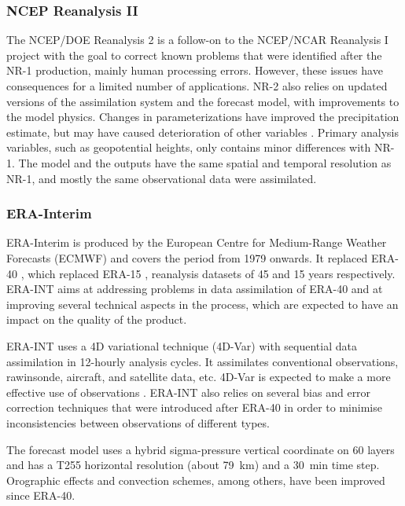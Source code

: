 \documentclass{ametsoc}
\begin{document}
\subsubsection{NCEP Reanalysis II}

The NCEP/DOE Reanalysis 2 \citep[NR-2,][]{Kanamitsu2002} is a follow-on to the NCEP/NCAR Reanalysis I project with the goal to correct known problems that were identified after the NR-1 production, mainly human processing errors. However, these issues have consequences for a limited number of applications. NR-2 also relies on updated versions of the assimilation system and the forecast model, with improvements to the model physics. Changes in parameterizations have improved the precipitation estimate, but may have caused deterioration of other variables \citep{Kistler2001, Kanamitsu2002}. Primary analysis variables, such as geopotential heights, only contains minor differences with NR-1. The model and the outputs have the same spatial and temporal resolution as NR-1, and mostly the same observational data were assimilated.


\subsubsection{ERA-Interim}

ERA-Interim \citep[ERA-INT, ][]{Dee2011a} is produced by the European Centre for Medium-Range Weather Forecasts (ECMWF) and covers the period from 1979 onwards. It replaced ERA-40 \citep{Uppala2005}, which replaced ERA-15 \citep{Gibson1997}, reanalysis datasets of 45 and 15 years respectively. ERA-INT aims at addressing problems in data assimilation of ERA-40 and at improving several technical aspects in the process, which are expected to have an impact on the quality of the product.

ERA-INT uses a 4D variational technique (4D-Var) with sequential data assimilation in 12-hourly analysis cycles. It assimilates conventional observations, rawinsonde, aircraft, and satellite data, etc. 4D-Var is expected to make a more effective use of observations \citep{Dee2011a}. ERA-INT also relies on several bias and error correction techniques that were introduced after ERA-40 in order to minimise inconsistencies between observations of different types.

The forecast model uses a hybrid sigma-pressure vertical coordinate on 60 layers and has a T255 horizontal resolution (about 79~km) and a 30~min time step. Orographic effects and convection schemes, among others, have been improved since ERA-40.
\end{document}
